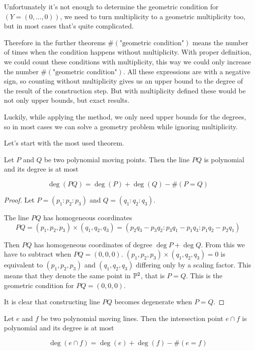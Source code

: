 \documentclass[a4paper]{article}
\begin{document}
\begin{remark}
    Unfortunately it's not enough to determine the geometric condition for $(Y=(0,\ldots,0))$, we need to turn multiplicity to a geometric multiplicity too, but in most cases that's quite complicated.

Therefore in the further theorems $\#(\text{"geometric condition"})$ means the number of times when the condition happens without multiplicity. With proper definition, we could count these conditions with multiplicity, this way we could only increase the number $\#(\text{"geometric condition"})$. All these expressions are with a negative sign, so counting without multiplicity gives us an upper bound to the degree of the result of the construction step. But with multiplicity defined these would be not only upper bounds, but exact results.

Luckily, while applying the method, we only need upper bounds for the degrees, so in most cases we can solve a geometry problem while ignoring multiplicity.
\end{remark}



Let's start with the most used theorem.

\begin{theorem}\label{l-pp}
    Let $P$ and $Q$ be two polynomial moving points. Then the line $PQ$ is polynomial and its degree is at most

$$\deg (PQ)= \deg (P) + \deg (Q) - \# (P=Q)$$
\end{theorem}

\begin{proof}
    Let $P=(p_1:p_2:p_3)$ and $Q=(q_1:q_2:q_3)$.

    The line $PQ$ has homogeneous coordinates
    $$PQ=(p_1,p_2,p_3)\times (q_1,q_2,q_3)=(p_2 q_3 - p_3 q_2 : p_3 q_1 - p_1 q_3 : p_1 q_2 - p_2 q_1)$$

    Then $PQ$ has homogeneous coordinates of degree $\deg P+\deg Q$. From this we have to subtract when $PQ=(0,0,0)$. $(p_1,p_2,p_3)\times (q_1,q_2,q_3)=0$ is equivalent to $(p_1,p_2,p_3)$ and $(q_1,q_2,q_3)$ differing only by a scaling factor. This means that they denote the same point in $\mathbb{P}^2$, that is $P=Q$. This is the geometric condition for $PQ=(0,0,0)$.

    It is clear that constructing line $PQ$ becomes degenerate when $P=Q$.
\end{proof}

\begin{theorem}\label{p-ll}
    Let $e$ and $f$ be two polynomial moving lines. Then the intersection point $e\cap f$ is polynomial and its degree is at most

$$\deg (e\cap f)= \deg (e) + \deg (f) - \# (e=f)$$


\end{theorem}
\end{document}
